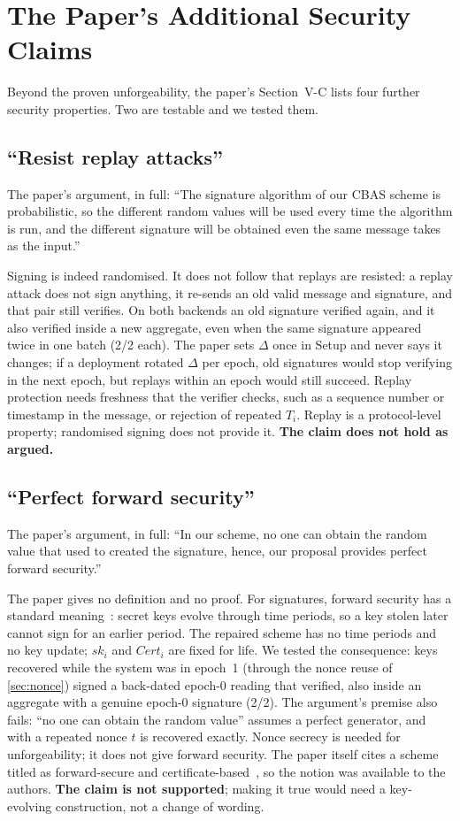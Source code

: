 \section{The Paper's Additional Security Claims}\label{sec:claims}

Beyond the proven unforgeability, the paper's Section~V-C lists four further security properties. Two are
testable and we tested them.

\subsection{``Resist replay attacks''}
The paper's argument, in full: ``The signature algorithm of our CBAS scheme is probabilistic, so the
different random values will be used every time the algorithm is run, and the different signature will
be obtained even the same message takes as the input.''~\cite{qiao2023}

Signing is indeed randomised. It does not follow that replays are resisted: a replay attack does not sign
anything, it re-sends an old valid message and signature, and that pair still verifies. On both backends
an old signature verified again, and it also verified inside a new aggregate, even when the same signature
appeared twice in one batch (2/2 each). The paper sets $\Delta$ once in \textsf{Setup} and never says it
changes; if a deployment rotated $\Delta$ per epoch, old signatures would stop verifying in the next epoch,
but replays within an epoch would still succeed. Replay protection needs freshness that the verifier
checks, such as a sequence number or timestamp in the message, or rejection of repeated $T_i$. Replay is a
protocol-level property; randomised signing does not provide it. \textbf{The claim does not hold as
argued.}

\subsection{``Perfect forward security''}
The paper's argument, in full: ``In our scheme, no one can obtain the random value that used to created
the signature, hence, our proposal provides perfect forward security.''~\cite{qiao2023}

The paper gives no definition and no proof. For signatures, forward security has a standard
meaning~\cite{bellare1999}: secret keys evolve through time periods, so a key stolen later cannot sign for
an earlier period. The repaired scheme has no time periods and no key update; $sk_i$ and $\mathit{Cert}_i$
are fixed for life. We tested the consequence: keys recovered while the system was in epoch~1 (through the
nonce reuse of \cref{sec:nonce}) signed a back-dated epoch-0 reading that verified, also inside an
aggregate with a genuine epoch-0 signature (2/2). The argument's premise also fails: ``no one can obtain the
random value'' assumes a perfect generator, and with a repeated nonce $t$ is recovered exactly. Nonce
secrecy is needed for unforgeability; it does not give forward security. The paper itself cites a scheme
titled as forward-secure and certificate-based~\cite{li2015}, so the notion was available to the authors.
\textbf{The claim is not supported}; making it true would need a key-evolving construction, not a change
of wording.
